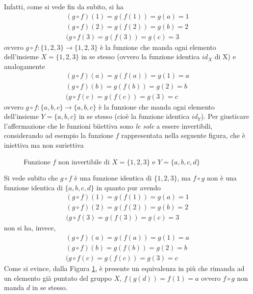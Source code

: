 Infatti, come si vede fin da subito, si ha
\begin{equation*}
  \begin{matrix}
    (g\circ f)(1)=g(f(1))=g(a)=1\\
    (g\circ f)(2)=g(f(2))=g(b)=2\\
    (g\circ f(3)=g(f(3))=g(c)=3
  \end{matrix}
\end{equation*}
ovvero $g\circ f:\{1,2,3\} \to \{1,2,3\}$ è la funzione che manda ogni elemento dell'insieme
$X=\{1,2,3\}$ in se stesso (ovvero la funzione identica $id_{X}$ di X) e analogamente
\begin{equation*}
  \begin{matrix}
    (g\circ f)(a)=g(f(a))=g(1)=a\\
    (g\circ f)(b)=g(f(b))=g(2)=b\\
    (g\circ f(c)=g(f(c))=g(3)=c
  \end{matrix}
\end{equation*}
ovvero $g\circ f:\{a,b,c\} \to \{a,b,c\}$ è la funzione che manda ogni elemento dell'insieme
$Y=\{a,b,c\}$ in se stesso (cioè la funzione identica $id_Y$). Per giusticare l'affermazione che le
funzioni biiettiva sono \textit{le sole} a essere invertibili, considerando ad esempio la funzione
$f$ rappresentata nella seguente figura, che è iniettiva ma non suriettiva
\clearpage
\begin{figure}[ht!]
  \centering
  \resizebox{15cm}{!}{}
  \caption{Funzione $f$ non invertibile di $X=\{1,2,3\}$ e $Y=\{a,b,c,d\}$}
  \label{fig:Compinveeproddimatrici2}
\end{figure}
Si vede subito che $g\circ f$ è una funzione identica di $\{1,2,3\}$, ma $f\circ g$ non è una funzione identica
di $\{a,b,c,d\}$ in quanto pur avendo
\begin{equation*}
  \begin{matrix}
    (g\circ f)(1)=g(f(1))=g(a)=1\\
    (g\circ f)(2)=g(f(2))=g(b)=2\\
    (g\circ f(3)=g(f(3))=g(c)=3
  \end{matrix}
\end{equation*}
non si ha, invece,
\begin{equation*}
  \begin{matrix}
    (g\circ f)(a)=g(f(a))=g(1)=a\\
    (g\circ f)(b)=g(f(b))=g(2)=b\\
    (g\circ f(c)=g(f(c))=g(3)=c
  \end{matrix}
\end{equation*}
Come si evince, dalla Figura \ref{fig:Compinveeproddimatrici2}, è presente un equivalenza in più che rimanda
ad un elemento già puntato del gruppo $X$, $f(g(d))=f(1)=a$ ovvero $f\circ g$ non manda $d$ in se stesso.

